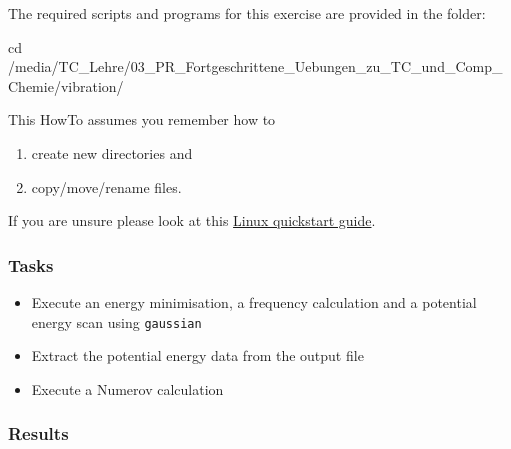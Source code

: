 \documentclass[
  letterpaper,
]{article}
\newenvironment{Shaded}{\begin{snugshade}}{\end{snugshade}}
\newcommand{\BuiltInTok}[1]{\textcolor[rgb]{0.00,0.23,0.31}{#1}}
\newcommand{\NormalTok}[1]{\textcolor[rgb]{0.00,0.23,0.31}{#1}}
\providecommand{\tightlist}{%
  \setlength{\itemsep}{0pt}\setlength{\parskip}{0pt}}\usepackage{longtable,booktabs,array}
\begin{document}
The required scripts and programs for this exercise are provided in the
folder:

\begin{Shaded}
\begin{Highlighting}[]
\BuiltInTok{cd}\NormalTok{ /media/TC\_Lehre/03\_PR\_Fortgeschrittene\_Uebungen\_zu\_TC\_und\_Comp\_Chemie/vibration/}
\end{Highlighting}
\end{Shaded}

\begin{tcolorbox}[enhanced jigsaw, toptitle=1mm, opacitybacktitle=0.6, colframe=quarto-callout-note-color-frame, toprule=.15mm, breakable, bottomrule=.15mm, left=2mm, title=\textcolor{quarto-callout-note-color}{\faInfo}\hspace{0.5em}{Note}, titlerule=0mm, leftrule=.75mm, bottomtitle=1mm, coltitle=black, arc=.35mm, rightrule=.15mm, opacityback=0, colback=white, colbacktitle=quarto-callout-note-color!10!white]

This HowTo assumes you remember how to

\begin{enumerate}
\def\labelenumi{\roman{enumi})}
\item
  create new directories and
\item
  copy/move/rename files.
\end{enumerate}

\end{tcolorbox}

If you are unsure please look at this
\protect\hyperlink{linux-quickstart-guide}{Linux quickstart guide}.

\hypertarget{tasks}{%
\subsubsection*{Tasks}\label{tasks}}

\begin{itemize}
\tightlist
\item
  Execute an energy minimisation, a frequency calculation and a
  potential energy scan using \texttt{gaussian}
\item
  Extract the potential energy data from the output file
\item
  Execute a Numerov calculation
\end{itemize}

\hypertarget{results}{%
\subsubsection*{Results}\label{results}}
\end{document}
